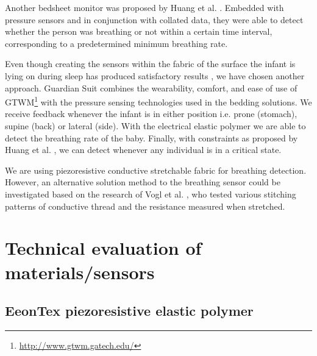 \documentclass{sigchi-ext}
\begin{document}
Another bedsheet monitor was proposed by Huang et al. \cite{a18-huang}. Embedded with pressure sensors and in conjunction with collated data, they were able to detect whether the person was breathing or not within a certain time interval, corresponding to a predetermined minimum breathing rate.

Even though creating the sensors within the fabric of the surface the infant is lying on during sleep has produced satisfactory results \cite{a18-huang, a33-kroutil}, we have chosen another approach. Guardian Suit combines the wearability, comfort, and ease of use of GTWM\footnote{\url{http://www.gtwm.gatech.edu/}} \cite{p285-fantauzzacoffin} with the pressure sensing technologies used in the bedding solutions. We receive feedback whenever the infant is in either position i.e. prone (stomach), supine (back) or lateral (side). With the electrical elastic polymer we are able to detect the breathing rate of the baby. Finally, with constraints as proposed by Huang et al. \cite{a18-huang}, we can detect whenever any individual is in a critical state.

We are using piezoresistive conductive
stretchable fabric for breathing detection. However, an alternative solution method to the breathing sensor
could be investigated based on the research of Vogl et al. \cite{stretcheband}, who
tested various stitching patterns of conductive thread and the resistance measured
when stretched.

\clearpage

\section{Technical evaluation of materials/sensors}

\subsection{EeonTex piezoresistive elastic polymer}
\end{document}
